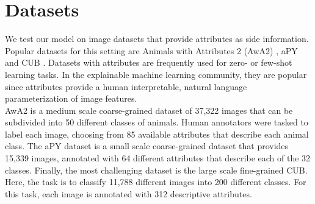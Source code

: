 \documentclass[a4paper,cleardoubleempty,BCOR1cm, 11pt]{report}
\begin{document}
\section{Datasets}
We test our model on image datasets that provide attributes as side information. Popular datasets for this setting are Animals with Attributes 2 (AwA2) \cite{8413121}, aPY \cite{farhadi2009describing} and CUB \cite{WahCUB_200_2011}. Datasets with attributes are frequently used for zero- or few-shot learning tasks. In the explainable machine learning community, they are popular since attributes provide a human interpretable, natural language parameterization of image features.\\
AwA2 is a medium scale coarse-grained dataset of 37,322 images that can be subdivided into 50 different classes of animals. Human annotators were tasked to label each image, choosing from 85 available attributes that describe each animal class. The aPY dataset is a small scale coarse-grained dataset that provides 15,339 images, annotated with 64 different attributes that describe each of the 32 classes. Finally, the most challenging dataset is the large scale fine-grained CUB. Here, the task is to classify 11,788 different images into 200 different classes. For this task, each image is annotated with 312 descriptive attributes.
\end{document}
